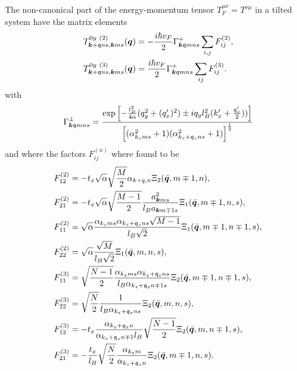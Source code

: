 \begin{summary}
The non-canonical part of the energy-momentum tensor \( T_F^{\mu \nu} = T^{\nu \mu} \) in a tilted system have the matrix elements
  \begin{align}
    T^{0y~(2)}_{\bm{k} + \mathfrak{q} ns, \bm{k} ms} (\bm{q})
    &= -\frac{ i \hbar v_{F} }{2}
      \Gamma _{\bm{k} \mathfrak{q} m n s}^+
      \sum\limits_{i,j}^{} F^{(2)}_{ij},\\
    T^{0y~(3)}_{\bm{k} + \mathfrak{q} ns, \bm{k} ms} (\bm{q})
    &= \frac{i \hbar v_F}{2}
      \Gamma ^{+}_{\bm{k} \mathfrak{q} m n s}
      \sum\limits_{ij}^{} F^{(3)}_{ij}.
  \end{align}
  with
  \[
    \Gamma _{\bm{k} \mathfrak{q} m n s}^{\pm} =
    \frac{
      \exp
      \left[
        - \frac{l_{B}^2}{4 \alpha } (q_{y}^2 + (q' _x)^2) \pm  i q_y l_B^2 (k' _x + \frac{q'_x}{2} )  )
      \right  ]
    }{
      \left[(\alpha_{k_z m s}^2 +1) (\alpha_{k_z + \mathfrak{q}_z ns} ^2 + 1)\right]^{\frac{1}{2}}
    }
  \]
  and where the factors \( F_{ij}^{(n)} \) where found to be
  \begin{align}
    F^{(2)}_{12}
    &= -t_x \sqrt{\alpha}  \sqrt{\frac{M}{2}} \alpha_{k+q, n} \Xi_2(\bar{\bm{q}}, m\mp 1, n),\\
    F^{(2)}_{21}
    &=
      -t_{x} \sqrt{\alpha} \sqrt{\frac{M-1}{2}} \frac{a_{\bm{k} m s}^2}{l_B a_{\bm{k} m \mp 1 s}}
      \Xi_{1} (\bar{\bm{q}}, m \mp 1, n, s),\\
    F^{(2)}_{11} &= \sqrt{\alpha}  \frac{\alpha_{k_z m s} \alpha_{k_z + \mathfrak{q}_z ns} \sqrt{M-1} }{ l_B \sqrt{2} }
                   \Xi_{1} (\bar{\bm{q}}, m\mp 1, n\mp 1, s),\\
    F^{(2)}_{22} &=
                   \sqrt{\alpha }
                   \frac{\sqrt{M} }{l_B \sqrt{2} }
                   \Xi_{1} ( \bar{\bm{q}}, m, n, s ),\\
    F^{(3)}_{11} &= \sqrt{\frac{N-1}{2}}
                   \frac{\alpha_{k_z m s} \alpha_{k_z + \mathfrak{q}_z n s}}{l_{B} \alpha_{k_z + \mathfrak{q}_z n \mp 1 s}}
                   \Xi_2( \bar{\bm{q}}, m\mp 1, n\mp 1, s ),\\
    F^{(3)}_{22} &= \sqrt{\frac{N}{2}}
                   \frac{1}{l_{B} \alpha_{k_z + \mathfrak{q}_z n s}}
                   \Xi_{2} (\bar{\bm{q}}, m, n, s),\\
    F^{(3)}_{12} &= -t_x \frac{\alpha_{k_z + \mathfrak{q}_z n}}{\alpha_{k_z + \mathfrak{q}_z n \mp 1} l_{B}}
                   \sqrt{\frac{N-1}{2}}
                   \Xi_{2} (\bar{\bm{q}}, m, n \mp 1, s),\\
    F^{(3)}_{21} &= -\frac{t_x}{l_{B}}
                   \sqrt{\frac{N}{2}}
                 \frac{\alpha_{k_z m}}{\alpha_{k_z + \mathfrak{q}_z n}}
                 \Xi_2 ( \bar{\bm{q}}, m \mp 1, n, s ).
\end{align}
\end{summary}
